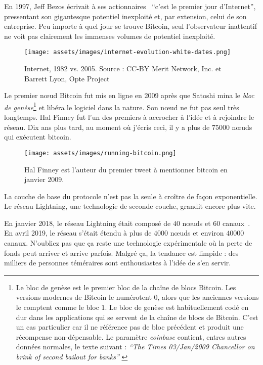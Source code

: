 En 1997, Jeff Bezos écrivait à ses actionnaires~\cite{bezos-letter}
\enquote{c'est le premier jour d'Internet}, pressentant son gigantesque
potentiel inexploité et, par extension, celui de son entreprise. Peu importe à
quel jour se trouve Bitcoin, seul l'observateur inattentif ne voit pas
clairement les immenses volumes de potentiel inexploité.

\begin{figure}
  \texttt{[image: assets/images/internet-evolution-white-dates.png]}
  \caption{Internet, 1982 vs. 2005. Source : CC-BY Merit Network, Inc. et
  Barrett Lyon, Opte Project}
  \label{fig:internet-evolution-white-dates}
\end{figure}

Le premier nœud Bitcoin fut mis en ligne en 2009 après que Satoshi mina le
\textit{bloc de genèse}\footnote{Le bloc de genèse est le premier bloc de la
chaîne de blocs Bitcoin. Les versions modernes de Bitcoin le numérotent $0$,
alors que les anciennes versions le comptent comme le bloc $1$. Le bloc de
genèse est habituellement codé en dur dans les applications qui se servent de la
chaîne de blocs de Bitcoin. C'est un cas particulier car il ne référence pas de
bloc précédent et produit une récompense non-dépensable. Le paramètre
\textit{coinbase} contient, entres autres données normales, le texte suivant :
\textit{\enquote{The Times 03/Jan/2009 Chancellor on brink of second bailout for
banks}} \cite{btcwiki:genesis-block}} et libéra le logiciel dans la nature. Son
nœud ne fut pas seul très longtemps. Hal Finney fut l'un des premiers à
accrocher à l'idée et à rejoindre le réseau. Dix ans plus tard, au moment où
j'écris ceci, il y a plus de $75 000$ nœuds qui exécutent bitcoin.

\begin{figure}
  \centering
  \texttt{[image: assets/images/running-bitcoin.png]}
  \caption{Hal Finney est l'auteur du premier tweet à mentionner bitcoin en
  janvier 2009.}
  \label{fig:running-bitcoin}
\end{figure}

La couche de base du protocole n'est pas la seule à croître de façon
exponentielle. Le réseau Lightning, une technologie de seconde couche, grandit
encore plus vite.

En janvier 2018, le réseau Lightning était composé de $40$ nœuds et $60$
canaux~\cite{web:lightning-nodes}. En avril 2019, le réseau s'était étendu à
plus de $4000$ nœuds et environ $40 000$ canaux. N'oubliez pas que ça reste une
technologie expérimentale où la perte de fonds peut arriver et arrive parfois.
Malgré ça, la tendance est limpide : des milliers de personnes téméraires sont
enthousiastes à l'idée de s'en servir. 


